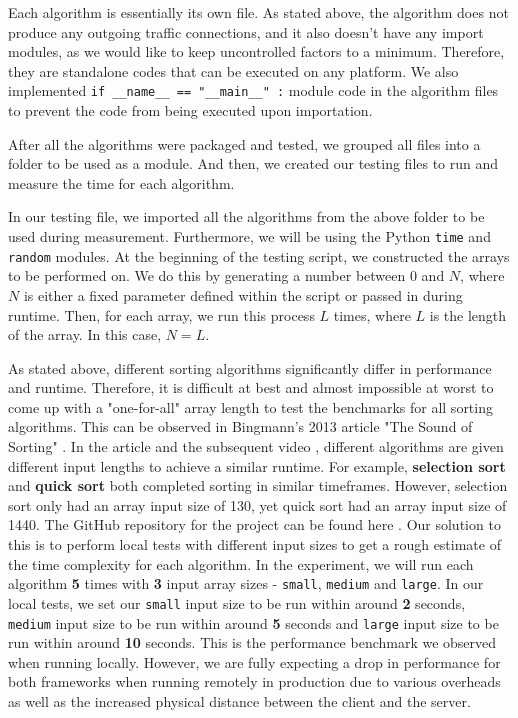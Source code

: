 Each algorithm is essentially its own file. As stated above, the algorithm does not produce any outgoing traffic connections, and it also doesn't have any import modules, as we would like to keep uncontrolled factors to a minimum. Therefore, they are standalone codes that can be executed on any platform. We also implemented \texttt{if __name__ == "__main__" :} module code in the algorithm files to prevent the code from being executed upon importation.

After all the algorithms were packaged and tested, we grouped all files into a folder to be used as a module. And then, we created our testing files to run and measure the time for each algorithm.

In our testing file, we imported all the algorithms from the above folder to be used during measurement. Furthermore, we will be using the Python \texttt{time} and \texttt{random} modules. At the beginning of the testing script, we constructed the arrays to be performed on. We do this by generating a number between 0 and \(N\), where \(N\) is either a fixed parameter defined within the script or passed in during runtime. Then, for each array, we run this process \(L\) times, where \(L\) is the length of the array. In this case, \(N = L\).

As stated above, different sorting algorithms significantly differ in performance and runtime. Therefore, it is difficult at best and almost impossible at worst to come up with a "one-for-all" array length to test the benchmarks for all sorting algorithms. This can be observed in Bingmann's 2013 article "The Sound of Sorting" \cite{exp50}. In the article and the subsequent video \cite{exp51}, different algorithms are given different input lengths to achieve a similar runtime. For example, \textbf{selection sort} and \textbf{quick sort} both completed sorting in similar timeframes. However, selection sort only had an array input size of 130, yet quick sort had an array input size of 1440. The GitHub repository for the project can be found here \cite{exp52}. Our solution to this is to perform local tests with different input sizes to get a rough estimate of the time complexity for each algorithm. In the experiment, we will run each algorithm \textbf{5} times with \textbf{3} input array sizes - \texttt{small}, \texttt{medium} and \texttt{large}. In our local tests, we set our \texttt{small} input size to be run within around \textbf{2} seconds, \texttt{medium} input size to be run within around \textbf{5} seconds and \texttt{large} input size to be run within around \textbf{10} seconds. This is the performance benchmark we observed when running locally. However, we are fully expecting a drop in performance for both frameworks when running remotely in production due to various overheads as well as the increased physical distance between the client and the server.

